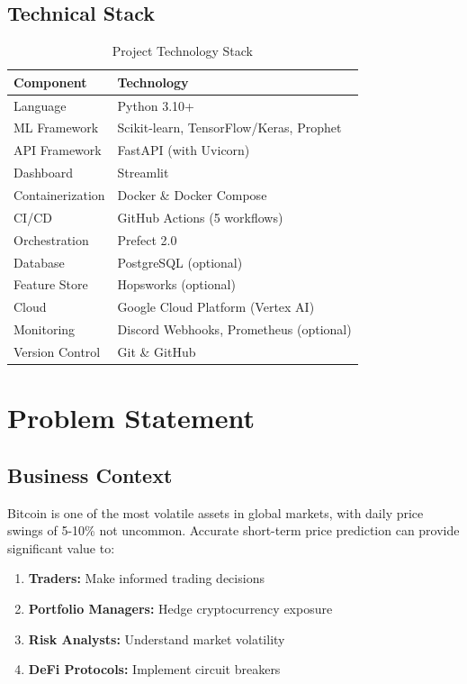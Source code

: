 \subsection{Technical Stack}
\begin{table}[H]
\centering
\caption{Project Technology Stack}
\begin{tabularx}{\textwidth}{lX}
\toprule
\textbf{Component} & \textbf{Technology} \\
\midrule
Language & Python 3.10+ \\
ML Framework & Scikit-learn, TensorFlow/Keras, Prophet \\
API Framework & FastAPI (with Uvicorn) \\
Dashboard & Streamlit \\
Containerization & Docker \& Docker Compose \\
CI/CD & GitHub Actions (5 workflows) \\
Orchestration & Prefect 2.0 \\
Database & PostgreSQL (optional) \\
Feature Store & Hopsworks (optional) \\
Cloud & Google Cloud Platform (Vertex AI) \\
Monitoring & Discord Webhooks, Prometheus (optional) \\
Version Control & Git \& GitHub \\
\bottomrule
\end{tabularx}
\end{table}

\section{Problem Statement}

\subsection{Business Context}
Bitcoin is one of the most volatile assets in global markets, with daily price swings of 5-10\% not uncommon. Accurate short-term price prediction can provide significant value to:
\begin{enumerate}
    \item \textbf{Traders:} Make informed trading decisions
    \item \textbf{Portfolio Managers:} Hedge cryptocurrency exposure
    \item \textbf{Risk Analysts:} Understand market volatility
    \item \textbf{DeFi Protocols:} Implement circuit breakers
\end{enumerate}

